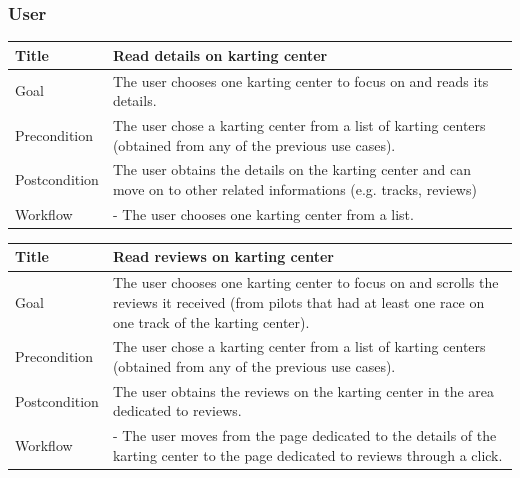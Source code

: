 \documentclass{beamer}
\begin{document}

\begin{frame}
    \frametitle{User}
    \begin{table}
        \tiny
        \begin{tabular}{|p{2cm}|p{6cm}|}
        \hline
        Title & \textbf{Read details on karting center} \\
        \hline
        Goal & The user chooses one karting center to focus on and reads its details. \\
        \hline
        Precondition & The user chose a karting center from a list of karting centers (obtained from any of the previous use cases).\\
        \hline
        Postcondition & The user obtains the details on the karting center and can move on to other related informations (e.g. tracks, reviews)\\
        \hline
        Workflow &
        - The user chooses one karting center from a list. \\
        \hline
        \end{tabular}
\end{table}

\begin{table}
    \tiny
    \begin{tabular}{|p{2cm}|p{6cm}|}
    \hline
    Title & \textbf{Read reviews on karting center} \\
    \hline
    Goal & The user chooses one karting center to focus on and scrolls the reviews it received (from pilots
    that had at least one race on one track of the karting center). \\
    \hline
    Precondition & The user chose a karting center from a list of karting centers (obtained from any of the previous use cases).\\
    \hline
    Postcondition & The user obtains the reviews on the karting center in the area dedicated to reviews. \\
    \hline
    Workflow &
    - The user moves from the page dedicated to the details of the karting center to the
    page dedicated to reviews through a click. \\
    \hline
    \end{tabular}
\end{table}
\end{frame}

\end{document}
